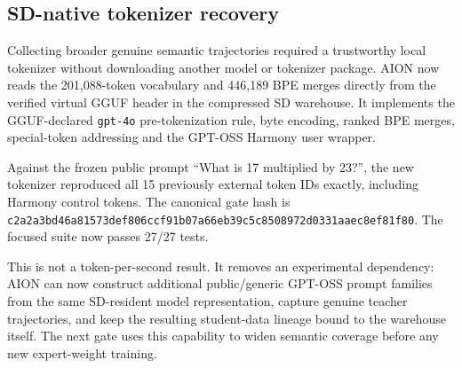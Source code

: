 \subsection{SD-native tokenizer recovery}

Collecting broader genuine semantic trajectories required a trustworthy local
tokenizer without downloading another model or tokenizer package.  AION now
reads the 201,088-token vocabulary and 446,189 BPE merges directly from the
verified virtual GGUF header in the compressed SD warehouse.  It implements
the GGUF-declared \texttt{gpt-4o} pre-tokenization rule, byte encoding, ranked
BPE merges, special-token addressing and the GPT-OSS Harmony user wrapper.

Against the frozen public prompt ``What is 17 multiplied by 23?'', the new
tokenizer reproduced all 15 previously external token IDs exactly, including
Harmony control tokens.  The canonical gate hash is
\texttt{c2a2a3bd46a81573def806ccf91b07a66eb39c5c8508972d0331aaec8ef81f80}.
The focused suite now passes 27/27 tests.

This is not a token-per-second result.  It removes an experimental dependency:
AION can now construct additional public/generic GPT-OSS prompt families from
the same SD-resident model representation, capture genuine teacher
trajectories, and keep the resulting student-data lineage bound to the
warehouse itself.  The next gate uses this capability to widen semantic
coverage before any new expert-weight training.
